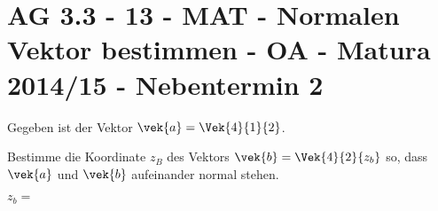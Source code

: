 \section{AG 3.3 - 13 - MAT - Normalen Vektor bestimmen - OA - Matura 2014/15 - Nebentermin 2}

\begin{beispiel}[AG 3.3]{1} %
				Gegeben ist der Vektor $\vek{a}=\Vek{4}{1}{2}$.
				
				Bestimme die Koordinate $z_{B}$ des Vektors $\vek{b}=\Vek{4}{2}{z_{b}}$ so, dass $\vek{a}$ und $\vek{b}$ aufeinander normal stehen.\leer
				
				$z_{b}=$ 
\end{beispiel}